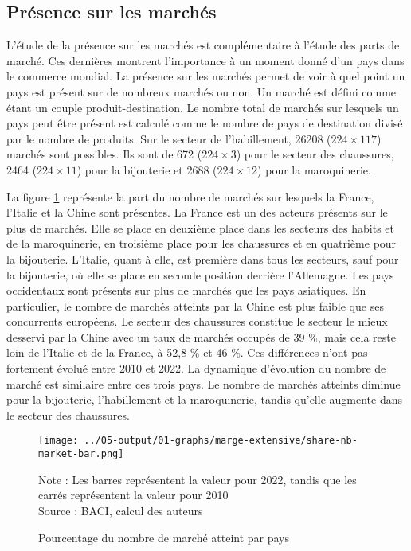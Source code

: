 \documentclass[french,10pt,a4paper]{article}
\begin{document}
\subsection{Présence sur les marchés}
L'étude de la présence sur les marchés est complémentaire à l'étude des parts de marché. Ces dernières montrent l'importance à un moment donné d'un pays dans le commerce mondial. La présence sur les marchés permet de voir à quel point un pays est présent sur de nombreux marchés ou non. Un marché est défini comme étant un couple produit-destination. Le nombre total de marchés sur lesquels un pays peut être présent est calculé comme le nombre de pays de destination divisé par le nombre de produits. Sur le secteur de l'habillement, 26208 ($224 \times 117$) marchés sont possibles. Ils sont de 672 ($224 \times 3$) pour le secteur des chaussures, 2464 ($224 \times 11$) pour la bijouterie et 2688 ($224 \times 12$) pour la maroquinerie.

\bigskip

La figure \ref{fig:nb-market-bar} représente la part du nombre de marchés sur lesquels la France, l'Italie et la Chine sont présentes. La France est un des acteurs présents sur le plus de marchés. Elle se place en deuxième place dans les secteurs des habits et de la maroquinerie, en troisième place pour les chaussures et en quatrième pour la bijouterie. L'Italie, quant à elle, est première dans tous les secteurs, sauf pour la bijouterie, où elle se place en seconde position derrière l'Allemagne. Les pays occidentaux sont présents sur plus de marchés que les pays asiatiques. En particulier, le nombre de marchés atteints par la Chine est plus faible que ses concurrents européens. Le secteur des chaussures constitue le secteur le mieux desservi par la Chine avec un taux de marchés occupés de 39 \%, mais cela reste loin de l'Italie et de la France, à 52,8 \% et 46 \%. Ces différences n'ont pas fortement évolué entre 2010 et 2022. La dynamique d'évolution du nombre de marché est similaire entre ces trois pays. Le nombre de marchés atteints diminue pour la bijouterie, l'habillement et la maroquinerie, tandis qu'elle augmente dans le secteur des chaussures.

\begin{figure}[!h]
  \centering
  \texttt{[image: ../05-output/01-graphs/marge-extensive/share-nb-market-bar.png]}
  \captionsetup{justification=justified, singlelinecheck=false, font=small}
  \caption*{Note : Les barres représentent la valeur pour 2022, tandis que les carrés représentent la valeur pour 2010 \\
  Source : BACI, calcul des auteurs}
  \captionsetup{justification=centering, singlelinecheck=true, font=normalsize}
  \caption{Pourcentage du nombre de marché atteint par pays}
  \label{fig:nb-market-bar}
\end{figure}
\end{document}

